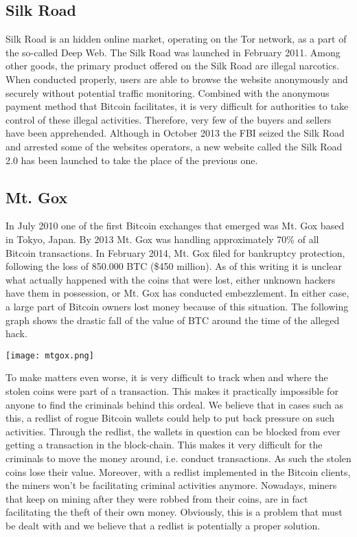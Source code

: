 \documentclass[12pt,journal,compsoc]{IEEEtran}
\begin{document}
\subsection{Silk Road}
Silk Road\cite{christin2013traveling} is an hidden online market, operating on the Tor network, as a part of the so-called Deep Web. The Silk Road was launched in February 2011. Among other goods, the primary product offered on the Silk Road are illegal narcotics. When conducted properly, users are able to browse the website anonymously and securely without potential traffic monitoring. Combined with the anonymous\cite{androulaki2013evaluating} payment method that Bitcoin facilitates, it is very difficult for authorities to take control of these illegal activities. Therefore, very few of the buyers and sellers have been apprehended.
Although in October 2013 the FBI seized the Silk Road and arrested some of the websites operators, a new website called the Silk Road 2.0 has been launched to take the place of the previous one.

\subsection{Mt. Gox}
In July 2010 one of the first Bitcoin exchanges that emerged was Mt. Gox based in Tokyo, Japan. By 2013 Mt. Gox was handling approximately 70\% of all Bitcoin transactions. In February 2014, Mt. Gox filed for bankruptcy protection, following the loss\cite{wallace2011rise} of 850.000 BTC (\$450 million). As of this writing it is unclear what actually happened with the coins that were lost, either unknown hackers have them in possession, or Mt. Gox has conducted embezzlement. In either case, a large part of Bitcoin owners lost money because of this situation. The following graph shows the drastic fall of the value of BTC around the time of the alleged hack.

\texttt{[image: mtgox.png]}

To make matters even worse, it is very difficult to track when and where the stolen coins were part of a transaction. This makes it practically impossible for anyone to find the criminals behind this ordeal. We believe that in cases such as this, a redlist of rogue Bitcoin wallets could help to put back pressure on such activities.
Through the redlist, the wallets in question can be blocked from ever getting a transaction in the block-chain. This makes it very difficult for the criminals to move the money around, i.e. conduct transactions. As such the stolen coins lose their value. Moreover, with a redlist implemented in the Bitcoin clients, the miners won't be facilitating criminal activities anymore.
Nowadays, miners that keep on mining after they were robbed from their coins, are in fact facilitating the theft of their own money. Obviously, this is a problem that must be dealt with and we believe that a redlist is potentially a proper solution.
\end{document}
